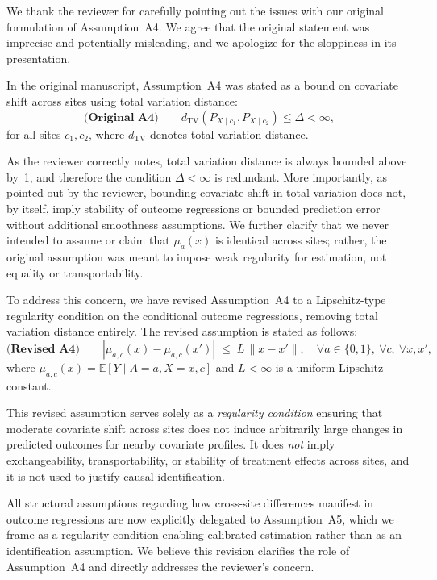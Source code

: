 {\color{blue}
We thank the reviewer for carefully pointing out the issues with our original formulation of Assumption~A4. We agree that the original statement was imprecise and potentially misleading, and we apologize for the sloppiness in its presentation.

In the original manuscript, Assumption~A4 was stated as a bound on covariate shift across sites using total variation distance:
\[
\textbf{(Original A4)} \qquad 
d_{\mathrm{TV}}\!\left(P_{X \mid c_1}, P_{X \mid c_2}\right) \le \Delta < \infty,
\]
for all sites $c_1, c_2$, where $d_{\mathrm{TV}}$ denotes total variation distance. 

As the reviewer correctly notes, total variation distance is always bounded above by~1, and therefore the condition $\Delta < \infty$ is redundant. 
More importantly, as pointed out by the reviewer, bounding covariate shift in total variation does not, by itself, imply stability of outcome regressions or bounded prediction error without additional smoothness assumptions. 
We further clarify that we never intended to assume or claim that $\mu_a(x)$ is identical across sites; rather, the original assumption was meant to impose weak regularity for estimation, not equality or transportability.


To address this concern, we have revised Assumption~A4 to a Lipschitz-type regularity condition on the conditional outcome regressions, removing total variation distance entirely. The revised assumption is stated as follows:
\[
\textbf{(Revised A4)} \qquad
\left| \mu_{a,c}(x) - \mu_{a,c}(x') \right|
\;\le\; L \,\|x - x'\| ,
\quad \forall a \in \{0,1\},\ \forall c,\ \forall x,x',
\]
where $\mu_{a,c}(x) = \mathbb{E}[Y \mid A=a, X=x, c]$ and $L < \infty$ is a uniform Lipschitz constant.

This revised assumption serves solely as a \emph{regularity condition} ensuring that moderate covariate shift across sites does not induce arbitrarily large changes in predicted outcomes for nearby covariate profiles.
It does \emph{not} imply exchangeability, transportability, or stability of treatment effects across sites, and it is not used to justify causal identification.

All structural assumptions regarding how cross-site differences manifest in outcome regressions are now explicitly delegated to Assumption~A5, which we frame as a regularity condition enabling calibrated estimation rather than as an identification assumption. We believe this revision clarifies the role of Assumption~A4 and directly addresses the reviewer’s concern.
}

